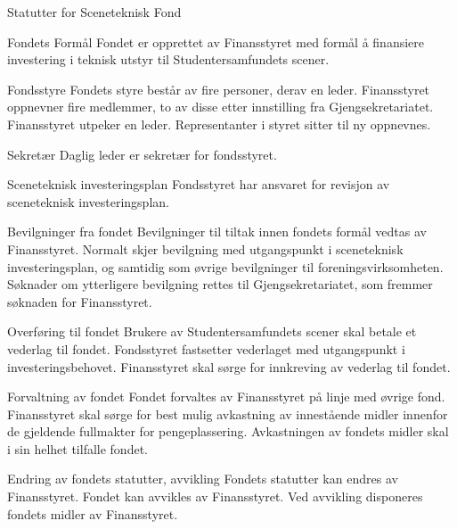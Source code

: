\begin{fond}{Statutter for Sceneteknisk Fond}
\begin{fondsparagraf}{Fondets Formål}
Fondet er opprettet av Finansstyret med formål å finansiere investering i teknisk
utstyr til Studentersamfundets scener.
\end{fondsparagraf}
\begin{fondsparagraf}{Fondsstyre}
Fondets styre består av fire personer, derav en leder. Finansstyret oppnevner
fire medlemmer, to av disse etter
innstilling fra Gjengsekretariatet. Finansstyret utpeker en leder.
Representanter i styret sitter til ny oppnevnes.
\end{fondsparagraf}
\begin{fondsparagraf}{Sekretær}
Daglig leder er sekretær for fondsstyret.
\end{fondsparagraf}
\begin{fondsparagraf}{Sceneteknisk investeringsplan}
Fondsstyret har ansvaret for revisjon av sceneteknisk investeringsplan.
\end{fondsparagraf}
\begin{fondsparagraf}{Bevilgninger fra fondet}
Bevilgninger til tiltak innen fondets formål vedtas av Finansstyret. Normalt
skjer bevilgning med utgangspunkt i sceneteknisk investeringsplan, og samtidig som øvrige bevilgninger til
foreningsvirksomheten. Søknader om ytterligere bevilgning rettes til Gjengsekretariatet, som fremmer søknaden for
Finansstyret.
\end{fondsparagraf}
\begin{fondsparagraf}{Overføring til fondet}
Brukere av Studentersamfundets scener skal betale et vederlag til fondet.
Fondsstyret fastsetter vederlaget med utgangspunkt i investeringsbehovet. Finansstyret skal sørge for innkreving av
vederlag til fondet.
\end{fondsparagraf}
\begin{fondsparagraf}{Forvaltning av fondet}
Fondet forvaltes av Finansstyret på linje med øvrige fond. Finansstyret skal
sørge for best mulig avkastning av innestående midler innenfor de gjeldende fullmakter for pengeplassering.
Avkastningen av fondets midler skal i sin helhet tilfalle fondet.
\end{fondsparagraf}
\begin{fondsparagraf}{Endring av fondets statutter, avvikling}
Fondets statutter kan endres av Finansstyret. Fondet kan avvikles av
Finansstyret. Ved avvikling disponeres fondets midler av Finansstyret.
\end{fondsparagraf}

\end{fond}


